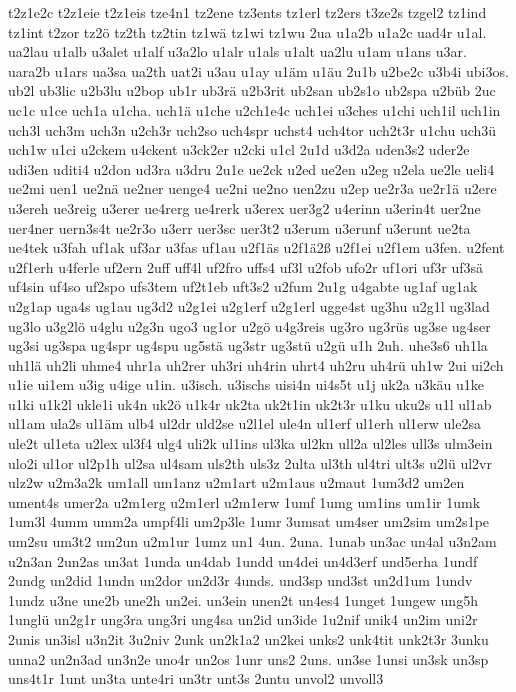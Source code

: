 {t2z1e2c
t2z1eie
t2z1eis
tze4n1
tz2ene
tz3ents
tz1erl
tz2ers
t3ze2s
tzgel2
tz1ind
tz1int
t2zor
tz2ö
tz2th
tz2tin
tz1wä
tz1wi
tz1wu
2ua
u1a2b
u1a2c
uad4r
u1al.
ua2lau
u1alb
u3alet
u1alf
u3a2lo
u1alr
u1als
u1alt
ua2lu
u1am
u1ans
u3ar.
uara2b
u1ars
ua3sa
ua2th
uat2i
u3au
u1ay
u1äm
u1äu
2u1b
u2be2c
u3b4i
ubi3os.
ub2l
ub3lic
u2b3lu
u2bop
ub1r
ub3rä
u2b3rit
ub2san
ub2s1o
ub2spa
u2büb
2uc
uc1c
u1ce
uch1a
u1cha.
uch1ä
u1che
u2ch1e4c
uch1ei
u3ches
u1chi
uch1il
uch1in
uch3l
uch3m
uch3n
u2ch3r
uch2so
uch4spr
uchst4
uch4tor
uch2t3r
u1chu
uch3ü
uch1w
u1ci
u2ckem
u4ckent
u3ck2er
u2cki
u1cl
2u1d
u3d2a
uden3s2
uder2e
udi3en
uditi4
u2don
ud3ra
u3dru
2u1e
ue2ck
u2ed
ue2en
u2eg
u2ela
ue2le
ueli4
ue2mi
uen1
ue2nä
ue2ner
uenge4
ue2ni
ue2no
uen2zu
u2ep
ue2r3a
ue2r1ä
u2ere
u3ereh
ue3reig
u3erer
ue4rerg
ue4rerk
u3erex
uer3g2
u4erinn
u3erin4t
uer2ne
uer4ner
uern3s4t
ue2r3o
u3err
uer3sc
uer3t2
u3erum
u3erunf
u3erunt
ue2ta
ue4tek
u3fah
uf1ak
uf3ar
u3fas
uf1au
u2f1äs
u2f1ä2ß
u2f1ei
u2f1em
u3fen.
u2fent
u2f1erh
u4ferle
uf2ern
2uff
uff4l
uf2fro
uffs4
uf3l
u2fob
ufo2r
uf1ori
uf3r
uf3sä
uf4sin
uf4so
uf2spo
ufs3tem
uf2t1eb
uft3s2
u2fum
2u1g
u4gabte
ug1af
ug1ak
u2g1ap
uga4s
ug1au
ug3d2
u2g1ei
u2g1erf
u2g1erl
ugge4st
ug3hu
u2g1l
ug3lad
ug3lo
u3g2lö
u4glu
u2g3n
ugo3
ug1or
u2gö
u4g3reis
ug3ro
ug3rüs
ug3se
ug4ser
ug3si
ug3spa
ug4spr
ug4spu
ug5stä
ug3str
ug3stü
u2gü
u1h
2uh.
uhe3s6
uh1la
uh1lä
uh2li
uhme4
uhr1a
uh2rer
uh3ri
uh4rin
uhrt4
uh2ru
uh4rü
uh1w
2ui
ui2ch
u1ie
ui1em
u3ig
u4ige
u1in.
u3isch.
u3ischs
uisi4n
ui4s5t
u1j
uk2a
u3käu
u1ke
u1ki
u1k2l
ukle1i
uk4n
uk2ö
u1k4r
uk2ta
uk2t1in
uk2t3r
u1ku
uku2s
u1l
ul1ab
ul1am
ula2s
ul1äm
ulb4
ul2dr
uld2se
u2l1el
ule4n
ul1erf
ul1erh
ul1erw
ule2sa
ule2t
ul1eta
u2lex
ul3f4
ulg4
uli2k
ul1ins
ul3ka
ul2kn
ull2a
ul2les
ull3s
ulm3ein
ulo2i
ul1or
ul2p1h
ul2sa
ul4sam
uls2th
uls3z
2ulta
ul3th
ul4tri
ult3s
u2lü
ul2vr
ulz2w
u2m3a2k
um1all
um1anz
u2m1art
u2m1aus
u2maut
1um3d2
um2en
ument4s
umer2a
u2m1erg
u2m1erl
u2m1erw
1umf
1umg
um1ins
um1ir
1umk
1um3l
4umm
umm2a
umpf4li
um2p3le
1umr
3umsat
um4ser
um2sim
um2s1pe
um2su
um3t2
um2un
u2m1ur
1umz
un1
4un.
2una.
1unab
un3ac
un4al
u3n2am
u2n3an
2un2as
un3at
1unda
un4dab
1undd
un4dei
un4d3erf
und5erha
1undf
2undg
un2did
1undn
un2dor
un2d3r
4unds.
und3sp
und3st
un2d1um
1undv
1undz
u3ne
une2b
une2h
un2ei.
un3ein
unen2t
un4es4
1unget
1ungew
ung5h
1unglü
un2g1r
ung3ra
ung3ri
ung4sa
un2id
un3ide
1u2nif
unik4
un2im
uni2r
2unis
un3isl
u3n2it
3u2niv
2unk
un2k1a2
un2kei
unks2
unk4tit
unk2t3r
3unku
unna2
un2n3ad
un3n2e
uno4r
un2os
1unr
uns2
2uns.
un3se
1unsi
un3sk
un3sp
uns4t1r
1unt
un3ta
unte4ri
un3tr
unt3s
2untu
unvol2
unvoll3
}
